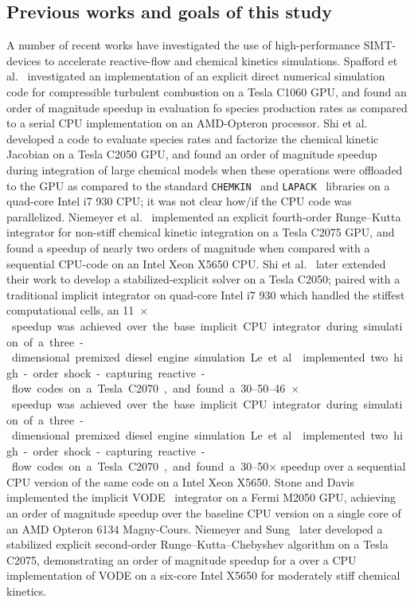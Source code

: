 \documentclass[12pt,number,sort&compress]{elsarticle}
\begin{document}
\subsection{Previous works and goals of this study}
A number of recent works have investigated the use of high-performance SIMT-devices to accelerate reactive-flow and chemical kinetics simulations.
Spafford et al.~\cite{Spafford:2010aa} investigated an implementation of an explicit direct numerical simulation code for compressible turbulent combustion on a Tesla C1060 GPU, and found an order of magnitude speedup in evaluation fo species production rates as compared to a serial CPU implementation on an AMD-Opteron processor.
Shi et al.~\cite{Shi:2011aa} developed a code to evaluate species rates and factorize the chemical kinetic Jacobian on a Tesla C2050 GPU, and found an order of magnitude speedup during integration of large chemical models when these operations were offloaded to the GPU as compared to the standard \texttt{CHEMKIN}~\cite{kee1989chemkin} and \texttt{LAPACK}~\cite{Anderson:1999aa} libraries on a quad-core Intel i7 930 CPU; it was not clear how\slash if the CPU code was parallelized.
Niemeyer et al.~\cite{Niemeyer:2011aa} implemented an explicit fourth-order Runge--Kutta integrator for non-stiff chemical kinetic integration on a Tesla C2075 GPU, and found a speedup of nearly two orders of magnitude when compared with a sequential CPU-code on an Intel Xeon X5650 CPU.
Shi et al.~\cite{Shi:2012aa} later extended their work to develop a stabilized-explicit solver on a Tesla C2050; paired with a traditional implicit integrator on quad-core Intel i7 930 which handled the stiffest computational cells, an \SIrange{11}{46}{$\times$} speedup was achieved over the base implicit CPU integrator during simulation of a three-dimensional premixed diesel engine simulation.
Le et al.~\cite{Le2013596} implemented two high-order shock-capturing reactive-flow codes on a Tesla C2070, and found a \numrange{30}{50}$\times$ speedup over a sequential CPU version of the same code on a Intel Xeon X5650.
Stone and Davis~\cite{Stone:2013aa} implemented the implicit VODE~\cite{Brown:1989vl} integrator on a Fermi M2050 GPU, achieving an order of magnitude speedup over the baseline CPU version on a single core of an AMD Opteron 6134 Magny-Cours.
Niemeyer and Sung~\cite{Niemeyer:2014aa} later developed a stabilized explicit second-order Runge--Kutta--Chebyshev algorithm on a Tesla C2075, demonstrating an order of magnitude speedup for a over a CPU implementation of VODE on a six-core Intel X5650 for moderately stiff chemical kinetics.
\end{document}
